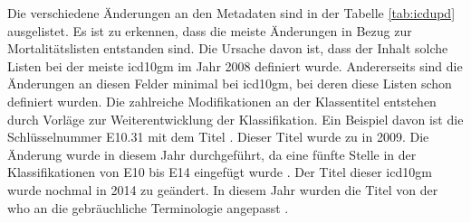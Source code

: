 Die verschiedene Änderungen an den Metadaten sind in der Tabelle \ref{tab:icdupd} ausgelistet. Es ist zu erkennen, dass die meiste Änderungen in Bezug zur Mortalitätslisten entstanden sind. Die Ursache davon ist, dass der Inhalt solche Listen bei der meiste \ac{icd10gm} im Jahr 2008 definiert wurde. Andererseits sind die Änderungen an diesen Felder minimal bei \ac{icd10gm}, bei deren diese Listen schon definiert wurden. Die zahlreiche Modifikationen an der Klassentitel entstehen durch Vorläge zur Weiterentwicklung der Klassifikation. Ein Beispiel davon ist die Schlüsselnummer {\ttfamily E10.31} mit dem Titel \grqq{}. Dieser Titel wurde zu \grqq{} in 2009. Die Änderung wurde in diesem Jahr durchgeführt, da eine fünfte Stelle in der Klassifikationen von {\ttfamily E10}  bis {\ttfamily E14} eingefügt wurde \cite{diab09}. Der Titel dieser \ac{icd10gm} wurde nochmal in 2014 zu \grqq{} geändert. In diesem Jahr wurden die Titel von der \ac{who} an die gebräuchliche Terminologie angepasst \cite{diab14}.

\newpage


